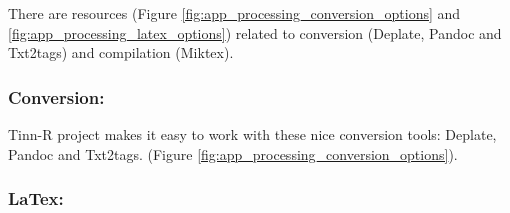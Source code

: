 There are resources
(Figure \ref{fig:app_processing_conversion_options} and
\ref{fig:app_processing_latex_options})
related to conversion (Deplate, Pandoc and Txt2tags) and compilation (Miktex).


\hypertarget{working_app_processing_conversion}{}
\subsubsection{Conversion:}

Tinn-R project makes it easy to work with these nice conversion tools: Deplate, Pandoc and Txt2tags.
(Figure \ref{fig:app_processing_conversion_options}).


\newpage
\hypertarget{working_app_processing_latex}{}
\subsubsection{LaTex:}

